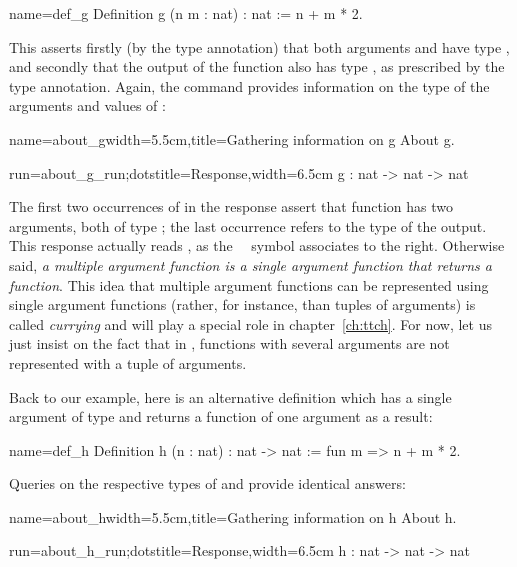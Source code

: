 \begin{coq}{name=def_g}{}
Definition g (n m : nat) : nat := n + m * 2.
\end{coq}
This asserts firstly
(by the  type annotation)
that both arguments  and  have type ,
and secondly that the
output of the function also has type , as prescribed by the
 type annotation. Again, the   command
provides information on the type of the arguments and values of
:

\begin{coq-left}{name=about_g}{width=5.5cm,title=Gathering information on g}
About g.
\end{coq-left}
\begin{coqout-right}{run=about_g_run;dots}{title=Response,width=6.5cm}
g : nat -> nat -> nat
\end{coqout-right}

The first two occurrences of  in the response
  assert that function  has two arguments,
 both of type ; the last occurrence refers to the type of
 the output. This response actually reads ,
 as the\ \ \C{->} symbol associates to the right. Otherwise said,
 {\em a multiple
 argument function is a single argument function that returns a
 function}.  This idea that multiple argument functions can be
represented using single argument functions (rather, for instance, than
tuples of arguments) is called {\em currying} and will play a special
role in chapter~\ref{ch:ttch}. For now, let us just insist on the fact
that in \Coq{}, functions with several arguments are not represented
with a tuple of arguments.


Back to our example, here is an alternative definition
  which has a single argument  of type  and returns
 a function of one argument as a result:

\begin{coq}{name=def_h}{}
Definition h (n : nat) : nat -> nat := fun m => n + m * 2.
\end{coq}

Queries on the respective types of  and  provide identical answers:

\begin{coq-left}{name=about_h}{width=5.5cm,title=Gathering information on h}
About h.
\end{coq-left}
\begin{coqout-right}{run=about_h_run;dots}{title=Response,width=6.5cm}
h : nat -> nat -> nat
\end{coqout-right}

